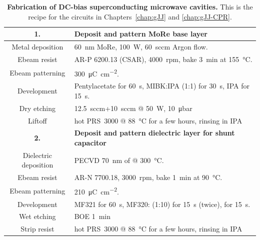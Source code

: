 \begin{table}
	\caption{
		\textbf{Fabrication of DC-bias superconducting microwave cavities.}
		This is the recipe for the circuits in Chapters~\ref{chap:gJJ} and \ref{chap:gJJ-CPR}.
	}
	\label{tab:fabRF}
\begin{tabularx}{\textwidth}{@{}cY@{}}
	\hline \hline
	\textbf{1.} & \textbf{Deposit and pattern MoRe base layer} \\
	\hline 
	Metal deposition & \SI{60}{\nano\meter} MoRe, \SI{100}{\watt}, \SI{60}{sccm} Argon flow. \\
	Ebeam resist & AR-P 6200.13 (CSAR), \SI{4000}{rpm}, bake \SI{3}{\minute} at \SI{155}{\celsius}. \\
	Ebeam patterning & \SI{300}{\micro\coulomb\per\centi\meter\squared}. \\
	Development & Pentylacetate for \SI{60}{\second}, MIBK:IPA (1:1) for \SI{30}{\second}, IPA for \SI{15}{\second}. \\
	Dry etching &  \SI{12.5}{sccm}+\SI{10}{sccm} @ \SI{50}{\watt}, \SI{10}{\micro\bar} \\
	Liftoff & hot PRS~3000 @ \SI{88}{\celsius} for a few hours, rinsing in IPA \\
	\hline
	
	\textbf{2.} & \textbf{Deposit and pattern dielectric layer for shunt capacitor} \\
	\hline 
	Dielectric deposition & PECVD \SI{70}{\nano\meter} of  @ \SI{300}{\celsius}. \\
	Ebeam resist & AR-N 7700.18, \SI{3000}{rpm}, bake \SI{1}{\minute} at \SI{90}{\celsius}. \\
	Ebeam patterning & \SI{210}{\micro\coulomb\per\centi\meter\squared}. \\
	Development & MF321 for \SI{60}{\second}, MF320: (1:10) for \SI{15}{\second} (twice),  for \SI{15}{\second}. \\
	Wet etching & BOE \SI{1}{\minute} \\
	Strip resist & hot PRS~3000 @ \SI{88}{\celsius} for a few hours, rinsing in IPA \\
	\hline
	

\end{tabularx}
\end{table}
